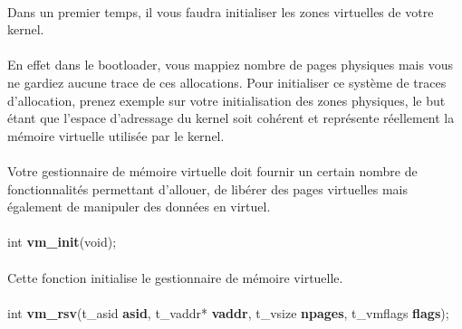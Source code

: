 \documentclass[10pt,a4wide]{article}
\begin{document}
\paragraph{}

Dans un premier temps, il vous faudra initialiser les zones virtuelles
de votre kernel.

\paragraph{}

En effet dans le bootloader, vous mappiez nombre de pages physiques
mais vous ne gardiez aucune trace de ces allocations. Pour initialiser
ce syst\`eme de traces d'allocation, prenez exemple sur votre
initialisation des zones physiques, le but \'etant que l'espace
d'adressage du kernel soit coh\'erent et repr\'esente r\'eellement
la m\'emoire virtuelle utilis\'ee par le kernel.

\paragraph{}

Votre gestionnaire de m\'emoire virtuelle doit fournir un certain nombre
de fonctionnalit\'es permettant d'allouer, de lib\'erer des pages
virtuelles mais \'egalement de manipuler des donn\'ees en virtuel.

\paragraph{}

\hspace{1.5cm}int \textbf{vm\_init}(void);

\paragraph{}

Cette fonction initialise le gestionnaire de m\'emoire virtuelle.

\paragraph{}

\hspace{1.5cm}int \textbf{vm\_rsv}(t\_asid \textbf{asid},
                                   t\_vaddr* \textbf{vaddr},
                                   t\_vsize \textbf{npages},
                                   t\_vmflags \textbf{flags});
\end{document}
